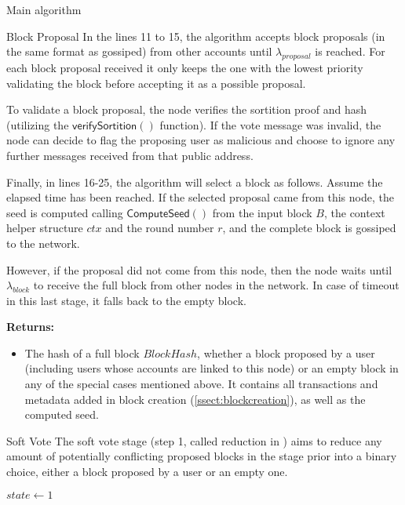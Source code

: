 \documentclass[10pt,a4paper]{article}
\begin{document}
\begin{section}{Main algorithm}
\begin{subsection}{Block Proposal}
In the lines 11 to 15, the algorithm accepts block proposals (in the same 
format as gossiped) from other accounts until $\lambda_{proposal}$ is reached.
For each block proposal received it only keeps the one with the lowest 
priority validating the block before accepting it as a possible proposal.

To validate a block proposal, the node verifies the sortition proof and hash
(utilizing the $\mathsf{verifySortition}()$ function).
If the vote message was invalid, the node can decide to flag the proposing user
as malicious and choose to ignore any further messages received from that public address.

Finally, in lines 16-25, the algorithm will select a block as 
follows. Assume the elapsed time has been reached. 
If the selected proposal came from this node, the seed is computed 
calling $\mathsf{ComputeSeed}()$ from the input block $B$, the context helper structure 
$ctx$ and the round number $r$, and the complete block is gossiped to the network.

However, if the proposal did not come from this node, then the node 
waits until $\lambda_{block}$ to receive the full block from other nodes
in the network.
In case of timeout in this last stage, it falls back to the empty block.

\bigskip
\noindent \textbf{Returns:}
\begin{itemize}
    \item The hash of a full block $BlockHash$, whether a block proposed by a user (including users 
    whose accounts are linked to this node) or an empty block in any of the special 
    cases mentioned above. It contains all transactions and metadata added in block creation (\ref{ssect:blockcreation}), 
    as well as the computed seed.
  \end{itemize}
\end{subsection}
\begin{subsection}{Soft Vote}\label{ssect:softvote}
The soft vote stage (step 1, called reduction in \cite{DBLP:conf/sosp/GiladHMVZ17}) aims to reduce 
any amount of potentially conflicting proposed blocks in the stage prior into a binary 
choice, either a block proposed by a user or an empty one.

\begin{algorithm}[H]
    \begin{algorithmic}[H]
    \State $state \gets 1$
    

\end{algorithmic}
\end{algorithm}
\end{subsection}
\end{section}
\end{document}
